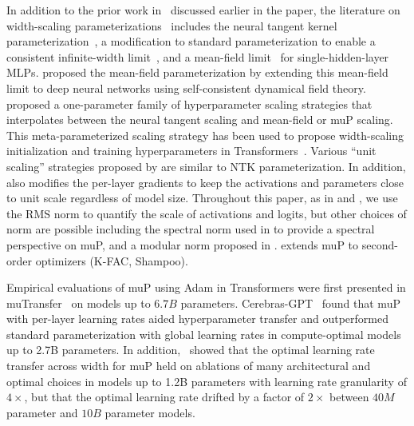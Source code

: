 \documentclass{article}
\theoremstyle{plain}
\theoremstyle{definition}
\theoremstyle{remark}
\begin{document}
In addition to the prior work in~\citet{yang2021tensoriv,yang2023tensorivb} discussed earlier in the paper, the literature on width-scaling parameterizations~\citep{lee2017deep,matthews2018gaussian,jacot2018neural} includes the neural tangent kernel parameterization~\citep{jacot2018neural}, a modification to standard parameterization to enable a consistent infinite-width limit~\citep{sohl2020infinite}, and a mean-field limit~\citep{mei2018mean,geiger2020disentangling,rotskoff2018parameters,chizat2018global,araujo2019mean} for single-hidden-layer MLPs. \citet{bordelon2022self} proposed the mean-field parameterization by extending this mean-field limit to deep neural networks using self-consistent dynamical field theory. \citet{yaida2022meta} proposed a one-parameter family of hyperparameter scaling strategies that interpolates between the neural tangent scaling and mean-field or muP scaling. This meta-parameterized scaling strategy has been used to propose width-scaling initialization and training hyperparameters in Transformers~\cite{dinan2023effective}. Various ``unit scaling'' strategies proposed by \citet{noam_unit_scaling,kaplan2019notes} are similar to NTK parameterization. In addition, \citet{blake2023unit} also modifies the per-layer gradients to keep the activations and parameters close to unit scale regardless of model size. Throughout this paper, as in \citet{yang2021tensoriv} and \citet{yang2023tensorivb}, we use the RMS norm to quantify the scale of activations and logits, but other choices of norm are possible including the spectral norm used in \citet{yang2023spectral} to provide a spectral perspective on muP, and a modular norm proposed in \citet{large2024scalable}. \citet{ishikawa2023parameterization} extends muP to second-order optimizers (K-FAC, Shampoo).

Empirical evaluations of muP using Adam in Transformers were first presented in muTransfer~\citep{yang2022tensorv} on models up to $6.7B$ parameters. Cerebras-GPT~\citep{dey2023cerebras} found that muP with per-layer learning rates aided hyperparameter transfer and outperformed standard parameterization with global learning rates in compute-optimal models up to 2.7B parameters. In addition,~\citet{lingle2024large} showed that the optimal learning rate transfer across width for muP held on ablations of many architectural and optimal choices in models up to 1.2B parameters with learning rate granularity of $4\times$, but that the optimal learning rate drifted by a factor of $2\times$ between $40M$ parameter and $10B$ parameter models.
\end{document}
